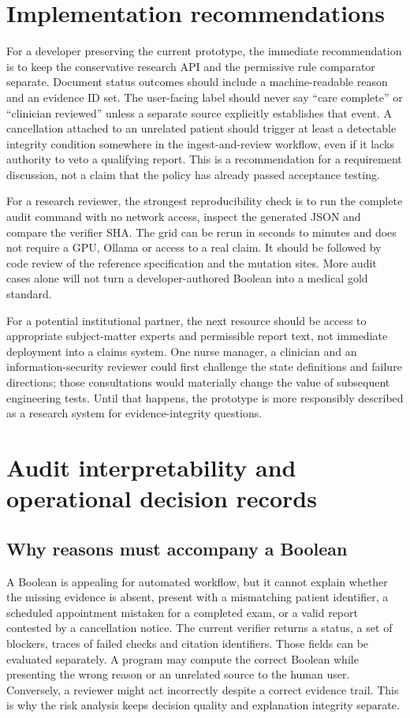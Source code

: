 \documentclass[11pt,twocolumn]{article}
\begin{document}
\section{Implementation recommendations}
For a developer preserving the current prototype, the immediate recommendation is to keep the conservative research API and the permissive rule comparator separate. Document status outcomes should include a machine-readable reason and an evidence ID set. The user-facing label should never say ``care complete'' or ``clinician reviewed'' unless a separate source explicitly establishes that event. A cancellation attached to an unrelated patient should trigger at least a detectable integrity condition somewhere in the ingest-and-review workflow, even if it lacks authority to veto a qualifying report. This is a recommendation for a requirement discussion, not a claim that the policy has already passed acceptance testing.

For a research reviewer, the strongest reproducibility check is to run the complete audit command with no network access, inspect the generated JSON and compare the verifier SHA. The grid can be rerun in seconds to minutes and does not require a GPU, Ollama or access to a real claim. It should be followed by code review of the reference specification and the mutation sites. More audit cases alone will not turn a developer-authored Boolean into a medical gold standard.

For a potential institutional partner, the next resource should be access to appropriate subject-matter experts and permissible report text, not immediate deployment into a claims system. One nurse manager, a clinician and an information-security reviewer could first challenge the state definitions and failure directions; those consultations would materially change the value of subsequent engineering tests. Until that happens, the prototype is more responsibly described as a research system for evidence-integrity questions.

\section{Audit interpretability and operational decision records}\label{sec:operations}
\subsection{Why reasons must accompany a Boolean}
A Boolean is appealing for automated workflow, but it cannot explain whether the missing evidence is absent, present with a mismatching patient identifier, a scheduled appointment mistaken for a completed exam, or a valid report contested by a cancellation notice. The current verifier returns a status, a set of blockers, traces of failed checks and citation identifiers. Those fields can be evaluated separately. A program may compute the correct Boolean while presenting the wrong reason or an unrelated source to the human user. Conversely, a reviewer might act incorrectly despite a correct evidence trail. This is why the risk analysis keeps decision quality and explanation integrity separate.
\end{document}
